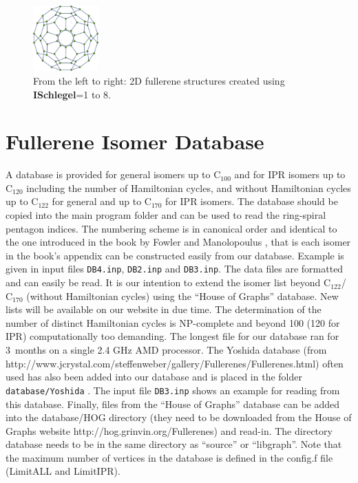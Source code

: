 \documentclass[article,a4paper,twoside]{memoir}
\newcommand{\C}[1]{\ensuremath{\mathrm{C}_{#1}}}
\newcommand{\filename}[1]{\texttt{#1}}
\newcommand{\paramname}[1]{{\color{green}\textbf{#1}}}
\begin{document}
\begin{figure}[htbp]
		 \includegraphics[width=0.225\textwidth]{Graph8.png}
     \caption{From the left to right: 2D fullerene structures created using \paramname{ISchlegel}=1 to 8.}
     \label{pic:ManySchlegel}
 \end{figure}

\section{Fullerene Isomer Database}
A database is provided for general isomers up to \C{100} and for IPR isomers up to
\C{120} including the number of Hamiltonian cycles, and without Hamiltonian cycles
up to \C{122} for general and up to \C{170} for IPR isomers. The database should be copied into
the main program folder and can be used to read the ring-spiral pentagon indices.
The numbering scheme is in canonical order and identical to the one introduced in the book by Fowler 
and Manolopoulus \cite{Atlas}, that is each isomer in the book's appendix can be 
constructed easily from our database. Example is given in input files  \filename{DB4.inp},
\filename{DB2.inp} and \filename{DB3.inp}.  The data files are formatted and can easily be read. It is our 
intention to extend the isomer list beyond \C{122}/\C{170} (without Hamiltonian cycles) using the ``House of Graphs'' database. 
New lists will be available on our website in due time.  The determination of the number of
distinct Hamiltonian cycles is NP-complete and beyond 100 (120 for IPR) 
computationally too demanding. The longest file for our database ran for 3~months on a single 2.4 GHz AMD processor.
The Yoshida database (from http://www.jcrystal.com/steffenweber/gallery/Fullerenes/Fullerenes.html) 
often used has also been added into our database and is placed in the
folder \filename{database/Yoshida} \cite{Yoshida}. The input file \filename{DB3.inp} shows an example for reading from
this database. Finally, files from the ``House of Graphs'' database can be added into the database/HOG directory (they
need to be downloaded from the House of Graphs website http://hog.grinvin.org/Fullerenes) and read-in. 
The directory database needs to be in the same directory as ``source'' or ``libgraph''.
Note that the maximum number of vertices in the database is defined in the config.f file (LimitALL and LimitIPR).
\end{document}
